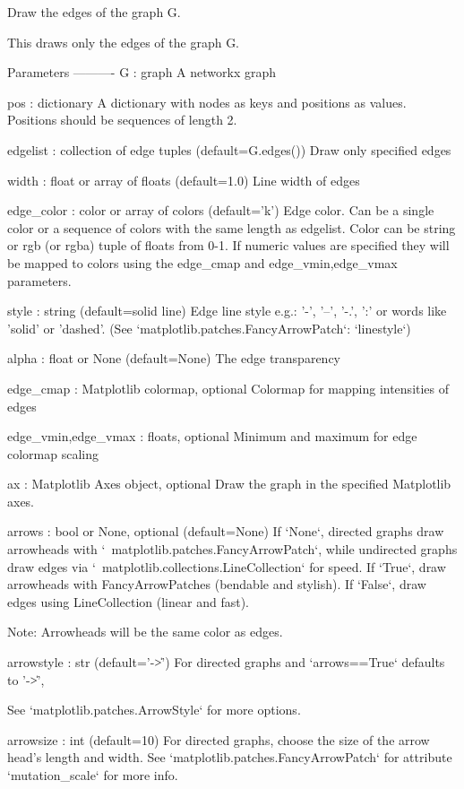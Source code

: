 \begin{DoxyVerb}Draw the edges of the graph G.

This draws only the edges of the graph G.

Parameters
----------
G : graph
    A networkx graph

pos : dictionary
    A dictionary with nodes as keys and positions as values.
    Positions should be sequences of length 2.

edgelist : collection of edge tuples (default=G.edges())
    Draw only specified edges

width : float or array of floats (default=1.0)
    Line width of edges

edge_color : color or array of colors (default='k')
    Edge color. Can be a single color or a sequence of colors with the same
    length as edgelist. Color can be string or rgb (or rgba) tuple of
    floats from 0-1. If numeric values are specified they will be
    mapped to colors using the edge_cmap and edge_vmin,edge_vmax parameters.

style : string (default=solid line)
    Edge line style e.g.: '-', '--', '-.', ':'
    or words like 'solid' or 'dashed'.
    (See `matplotlib.patches.FancyArrowPatch`: `linestyle`)

alpha : float or None (default=None)
    The edge transparency

edge_cmap : Matplotlib colormap, optional
    Colormap for mapping intensities of edges

edge_vmin,edge_vmax : floats, optional
    Minimum and maximum for edge colormap scaling

ax : Matplotlib Axes object, optional
    Draw the graph in the specified Matplotlib axes.

arrows : bool or None, optional (default=None)
    If `None`, directed graphs draw arrowheads with
    `~matplotlib.patches.FancyArrowPatch`, while undirected graphs draw edges
    via `~matplotlib.collections.LineCollection` for speed.
    If `True`, draw arrowheads with FancyArrowPatches (bendable and stylish).
    If `False`, draw edges using LineCollection (linear and fast).

    Note: Arrowheads will be the same color as edges.

arrowstyle : str (default='-\|>')
    For directed graphs and `arrows==True` defaults to '-\|>',

    See `matplotlib.patches.ArrowStyle` for more options.

arrowsize : int (default=10)
    For directed graphs, choose the size of the arrow head's length and
    width. See `matplotlib.patches.FancyArrowPatch` for attribute
    `mutation_scale` for more info.


\end{DoxyVerb}
